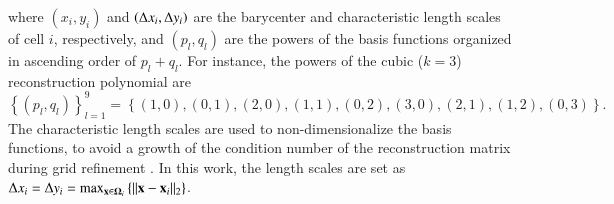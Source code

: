 where $\left(x_i,y_i\right)$ and $\left(\mathrm\Delta x_i, \mathrm\Delta y_i\right)$ are the barycenter and characteristic length scales of cell $i$, respectively, and $\left(p_l,q_l\right)$ are the powers of the basis functions organized in ascending order of $p_l+q_l$. For instance, the powers of the cubic ($k=3$) reconstruction polynomial are
\begin{equation}
    \left\{ \left(p_l,q_l\right) \right\}^9_{l=1}= \left\{ \left(1,0\right), \left(0,1\right), \left(2,0\right),\left(1,1\right),\left(0,2\right),\left(3,0\right),\left(2,1\right),\left(1,2\right),\left(0,3\right) \right\}.
\end{equation}
The characteristic length scales are used to non-dimensionalize the basis functions, to avoid a growth of the condition number of the reconstruction matrix during grid refinement \cite{abgrall1994essentially,friedrich1998weighted_WENO}. In this work, the length scales are set as $ \mathrm\Delta x_i = \mathrm\Delta y_i = \max_{\mathbf{x} \in \mathbf{\Omega}_i} \left\{\|\mathbf{x} - \mathbf{x}_{i}\|_2\right\}$.

